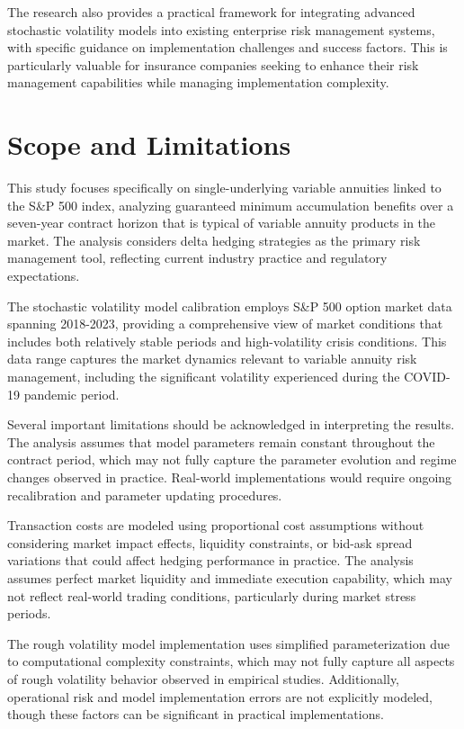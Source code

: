 \documentclass[12pt,a4paper]{report}
\begin{document}
The research also provides a practical framework for integrating advanced stochastic volatility models into existing enterprise risk management systems, with specific guidance on implementation challenges and success factors. This is particularly valuable for insurance companies seeking to enhance their risk management capabilities while managing implementation complexity.

\section{Scope and Limitations}

This study focuses specifically on single-underlying variable annuities linked to the S\&P 500 index, analyzing guaranteed minimum accumulation benefits over a seven-year contract horizon that is typical of variable annuity products in the market. The analysis considers delta hedging strategies as the primary risk management tool, reflecting current industry practice and regulatory expectations.

The stochastic volatility model calibration employs S\&P 500 option market data spanning 2018-2023, providing a comprehensive view of market conditions that includes both relatively stable periods and high-volatility crisis conditions. This data range captures the market dynamics relevant to variable annuity risk management, including the significant volatility experienced during the COVID-19 pandemic period.

Several important limitations should be acknowledged in interpreting the results. The analysis assumes that model parameters remain constant throughout the contract period, which may not fully capture the parameter evolution and regime changes observed in practice. Real-world implementations would require ongoing recalibration and parameter updating procedures.

Transaction costs are modeled using proportional cost assumptions without considering market impact effects, liquidity constraints, or bid-ask spread variations that could affect hedging performance in practice. The analysis assumes perfect market liquidity and immediate execution capability, which may not reflect real-world trading conditions, particularly during market stress periods.

The rough volatility model implementation uses simplified parameterization due to computational complexity constraints, which may not fully capture all aspects of rough volatility behavior observed in empirical studies. Additionally, operational risk and model implementation errors are not explicitly modeled, though these factors can be significant in practical implementations.
\end{document}
